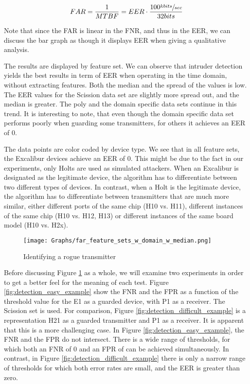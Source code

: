 \documentclass[conference]{IEEEtran}
\begin{document}
  \[FAR = \frac{1}{MTBF} = EER \cdot \frac{100 \sfrac{kbits}{sec}}{32bits}\]
  
  Note that since the FAR is linear in the FNR, and thus in the EER, we can discuss the bar graph as though it displays EER when giving a qualitative analysis.
  
  The results are displayed by feature set. We can observe that intruder detection yields the best results in term of EER when operating in the time domain, without extracting features. Both the median and the spread of the values is low. The EER values for the Scission data set are slightly more spread out, and the median is greater. The poly and the domain specific data sets continue in this trend. It is interesting to note, that even though the domain specific data set performs poorly when guarding some transmitters, for others it achieves an EER of 0.
  
  The data points are color coded by device type. We see that in all feature sets, the Excalibur devices achieve an EER of 0. This might be due to the fact in our experiments, only Holts are used as simulated attackers. When an Excalibur is designated as the legitimate device, the algorithm has to differentiate between two different types of devices. In contrast, when a Holt is the legitimate device, the algorithm has to differentiate between transmitters that are much more similar, either different ports of the same chip (H10 vs. H11), different instances of the same chip (H10 vs. H12, H13) or different instances of the same board model (H10 vs. H2x).
  
  \begin{figure}[t]
    \centering
    \texttt{[image: Graphs/far\_feature\_sets\_w\_domain\_w\_median.png]}
    \caption{Identifying a rogue transmitter}
    \label{fig:rogue_transmitter_results}
  \end{figure}
  
  Before discussing Figure \ref{fig:rogue_transmitter_results} as a whole, we will examine two experiments in order to get a better feel for the meaning of each test. Figure \ref{fig:detection_easy_example} show the FNR and the FPR as a function of the threshold value for the E1 as a guarded device, with P1 as a receiver. The Scission set is used. For comparison, Figure \ref{fig:detection_difficult_example} is a representation H21 as a guarded transmitter and P1 as a receiver. It is apparent that this is a more challenging case. In Figure \ref{fig:detection_easy_example}, the FNR and the FPR do not intersect. There is a wide range of thresholds, for which both an FNR of 0 and an FPR of can be achieved simultaneously. In contrast, in Figure \ref{fig:detection_difficult_example} there is only a narrow range of thresholds for which both error rates are small, and the EER is greater than zero.
  
\end{document}
